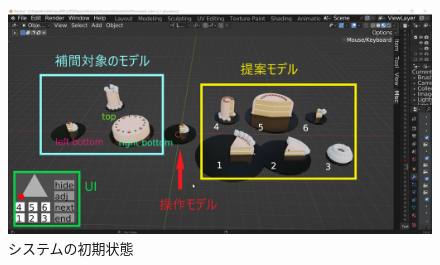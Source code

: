 \begin{figure}[h]
	\begin{center}
		\includegraphics[scale=0.25]{./imgs/systemUse/init.png}
            \caption{システムの初期状態}\label{fig:systemOverViewInit}
	\end{center}
\end{figure}



